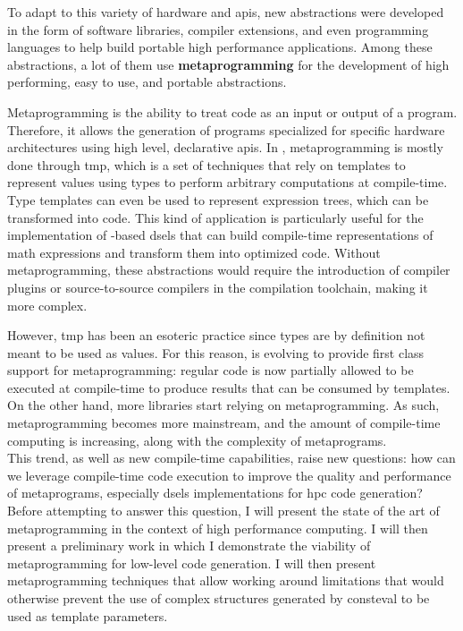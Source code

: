 \documentclass[main]{subfiles}
\begin{document}
To adapt to this variety of hardware and \glspl{api}, new abstractions
were developed in the form of software libraries, compiler extensions,
and even programming languages to help build portable high performance
applications.
Among these abstractions, a lot of them use \textbf{metaprogramming} for the
development of high performing, easy to use, and portable abstractions.

Metaprogramming is the ability to treat code as an input or output of a program.
Therefore, it allows the generation of programs specialized for
specific hardware architectures using high level, declarative \glspl{api}.
In \cpp, metaprogramming is mostly done through \gls{tmp}, which is a set of
techniques that rely on \cpp templates to represent values using types to
perform arbitrary computations at compile-time.
Type templates can even be used to represent expression trees,
which can be transformed into code. This kind of application is particularly
useful for the implementation of \cpp-based \glspl{dsel} that can build
compile-time representations of math expressions and transform them into
optimized code. Without metaprogramming, these abstractions would require
the introduction of compiler plugins or source-to-source compilers in the
compilation toolchain, making it more complex.

However, \gls{tmp} has been an esoteric practice since types are by definition
not meant to be used as values. For this reason, \cpp is evolving to provide
first class support for metaprogramming: regular \cpp code is now partially
allowed to be executed at compile-time to produce results that can be consumed
by templates. On the other hand, more \cpp libraries start relying on \cpp
metaprogramming. As such, \cpp metaprogramming becomes more mainstream,
and the amount of compile-time computing is increasing, along with
the complexity of \cpp metaprograms.
\\


This trend, as well as new \cpp compile-time capabilities, raise new questions:
how can we leverage compile-time \cpp code execution to improve the quality
and performance of \cpp metaprograms, especially \glspl{dsel} implementations
for \acrlong{hpc} code generation?
\\

Before attempting to answer this question, I will present the state of the art
of metaprogramming in the context of high performance computing.
I will then present a preliminary work in which I demonstrate the viability
of \cpp metaprogramming for low-level code generation.
I will then present metaprogramming techniques that allow working around
\cpp limitations that would otherwise prevent the use of complex structures
generated by \gls{consteval} to be used as template parameters.
\end{document}
